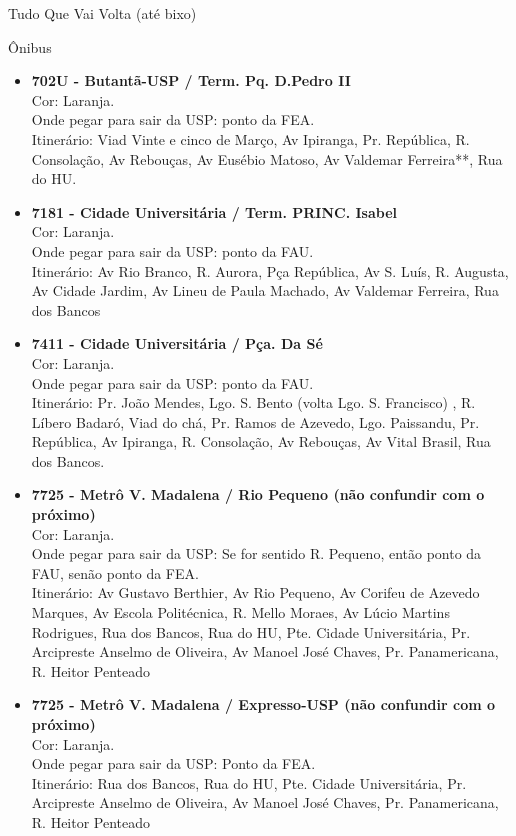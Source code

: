 \begin{secao}{Tudo Que Vai Volta (até bixo)}
\begin{subsecao}{Ônibus}
\begin{itemize}
  \item {\bf 702U - Butantã-USP / Term. Pq. D.Pedro II}\\
    Cor: Laranja.\\
    Onde pegar para sair da USP: ponto da FEA.\\
    Itinerário: Viad Vinte e cinco de Março, Av Ipiranga, Pr. República, R. Consolação, Av
    Rebouças, Av Eusébio Matoso, Av Valdemar Ferreira**, Rua do HU.

  \item {\bf 7181 - Cidade Universitária / Term. PRINC. Isabel}\\
    Cor: Laranja.\\
    Onde pegar para sair da USP: ponto da FAU.\\
    Itinerário: Av Rio Branco, R. Aurora, Pça República, Av S. Luís, R. Augusta, Av Cidade
    Jardim, Av Lineu de Paula Machado, Av Valdemar Ferreira, Rua dos Bancos

  \item {\bf 7411 - Cidade Universitária / Pça. Da Sé}\\
    Cor: Laranja.\\
    Onde pegar para sair da USP: ponto da FAU.\\
    Itinerário: Pr. João Mendes, Lgo. S. Bento (volta Lgo. S. Francisco) , R. Líbero Badaró,
    Viad do chá, Pr. Ramos de Azevedo, Lgo. Paissandu, Pr. República, Av
    Ipiranga, R. Consolação, Av Rebouças, Av Vital Brasil, Rua dos Bancos.

  \item {\bf 7725 - Metrô V. Madalena / Rio Pequeno (não confundir com o próximo)}\\
    Cor: Laranja.\\
    Onde pegar para sair da USP: Se for sentido R. Pequeno, então ponto da FAU,
    senão ponto da FEA.\\
    Itinerário: Av Gustavo Berthier, Av Rio Pequeno, Av Corifeu de Azevedo Marques, Av
    Escola Politécnica, R. Mello Moraes, Av Lúcio Martins Rodrigues, Rua dos Bancos,
    Rua do HU, Pte. Cidade Universitária, Pr. Arcipreste
    Anselmo de Oliveira, Av Manoel José Chaves, Pr. Panamericana, R. Heitor
    Penteado

  \item {\bf 7725 - Metrô V. Madalena / Expresso-USP (não confundir com o próximo)}\\
    Cor: Laranja.\\
    Onde pegar para sair da USP: Ponto da FEA.\\
    Itinerário:  Rua dos Bancos, Rua do HU, Pte. Cidade Universitária, Pr. Arcipreste Anselmo de Oliveira, Av Manoel José Chaves, Pr. Panamericana, R. Heitor Penteado


\end{itemize}
\end{subsecao}
\end{secao}
